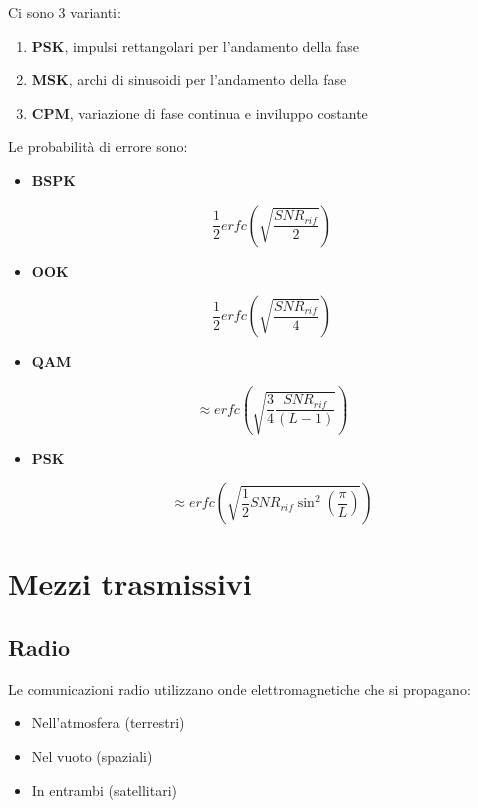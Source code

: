 \documentclass{article}
\begin{document}
\begin{itemize}
    \newpage

    Ci sono 3 varianti:
    \begin{enumerate}
        \item \textbf{PSK}, impulsi rettangolari per l'andamento della fase
        \item \textbf{MSK}, archi di sinusoidi per l'andamento della fase
        \item \textbf{CPM}, variazione di fase continua e inviluppo costante\newline
    \end{enumerate}
    
\end{itemize}

\noindent Le probabilità di errore sono:
\begin{itemize}
    \item \textbf{BSPK}

        $$\frac{1}{2}erfc\left(\sqrt{\frac{SNR_{rif}}{2}}\right)$$

    \item \textbf{OOK}

        $$\frac{1}{2}erfc\left(\sqrt{\frac{SNR_{rif}}{4}}\right)$$

    \item \textbf{QAM}

        $$\approx erfc\left(\sqrt{\frac{3}{4}\frac{SNR_{rif}}{(L-1)}}\right)$$

    \item \textbf{PSK}

        $$\approx erfc\left(\sqrt{\frac{1}{2}SNR_{rif}\sin^2\left(\frac{\pi}{L}\right)}\right)$$\newline
    
\end{itemize}

\newpage

\section{Mezzi trasmissivi}

\subsection{Radio}

Le comunicazioni radio utilizzano onde elettromagnetiche che si propagano:
\begin{itemize}
    \item Nell'atmosfera (terrestri)
    \item Nel vuoto (spaziali)
    \item In entrambi (satellitari)
\end{itemize}
\end{document}
